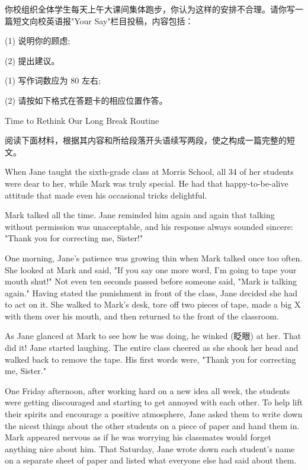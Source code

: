 \documentclass{英语试卷}
\begin{document}
\par 你校组织全体学生每天上午大课间集体跑步，你认为这样的安排不合理。请你写一篇短文向校英语报"Your Say"栏目投稿，内容包括：\par
\par (1) 说明你的顾虑;\par
\par (2) 提出建议。\par
\par (1) 写作词数应为 80 左右;\par
\par (2) 请按如下格式在答题卡的相应位置作答。\par
\par Time to Rethink Our Long Break Routine\par
{}
\par 阅读下面材料，根据其内容和所给段落开头语续写两段，使之构成一篇完整的短文。\par
\par When Jane taught the sixth-grade class at Morris School, all 34 of her students were dear to her, while Mark was truly special. He had that happy-to-be-alive attitude that made even his occasional tricks delightful.\par
\par Mark talked all the time. Jane reminded him again and again that talking without permission was unacceptable, and his response always sounded sincere: "Thank you for correcting me, Sister!"\par
\par One morning, Jane's patience was growing thin when Mark talked once too often. She looked at Mark and said, "If you say one more word, I'm going to tape your mouth shut!" Not even ten seconds passed before someone said, "Mark is talking again." Having stated the punishment in front of the class, Jane decided she had to act on it. She walked to Mark's desk, tore off two pieces of tape, made a big X with them over his mouth, and then returned to the front of the classroom.\par
\par As Jane glanced at Mark to see how he was doing, he winked (眨眼) at her. That did it! Jane started laughing. The entire class cheered as she shook her head and walked back to remove the tape. His first words were, "Thank you for correcting me, Sister."\par
\par One Friday afternoon, after working hard on a new idea all week, the students were getting discouraged and starting to get annoyed with each other. To help lift their spirits and encourage a positive atmosphere, Jane asked them to write down the nicest things about the other students on a piece of paper and hand them in. Mark appeared nervous as if he was worrying his classmates would forget anything nice about him. That Saturday, Jane wrote down each student's name on a separate sheet of paper and listed what everyone else had said about them.\par
\end{document}

